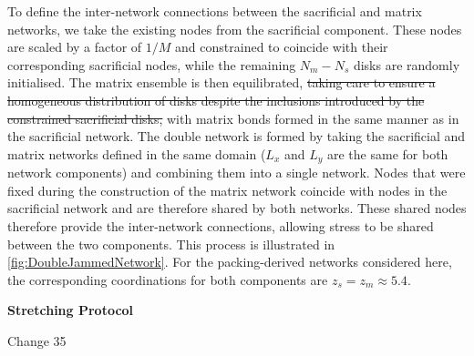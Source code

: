 \documentclass[asymmetricmargins]{library/duthesis}%
\newcommand{\DiffReportBodyFont}{\small}
\newcommand{\DiffReportLocationFont}{\large\bfseries}
\newcommand{\DiffReportMetaFont}{\small\ttfamily}
\newcommand{\DiffReportLocation}[1]{%
  \Needspace{4\baselineskip}%
  \par\medskip
  {\DiffReportLocationFont #1\par}
}
\newcommand{\DiffReportChange}[1]{%
  \Needspace{4\baselineskip}%
  \par\smallskip
  {\DiffReportMetaFont Change #1\par}
  \smallskip
}
\newenvironment{DiffReportContent}
  {\begingroup\DiffReportBodyFont}
  {\par\endgroup\medskip}
\providecommand{\DIFdel}[1]{{\protect\color{red}\sout{#1}}}                      %
\providecommand{\DIFdelbegin}{} %
\providecommand{\DIFdelend}{} %
\begin{document}
\begin{DiffReportContent}
To define the inter-network connections between the sacrificial and matrix networks, we take the existing nodes from the sacrificial component. These nodes are scaled by a factor of $1/M$ and constrained to coincide with their corresponding sacrificial nodes, while the remaining $N_m - N_s$ disks are randomly initialised. The matrix ensemble is then equilibrated, \DIFdelbegin \DIFdel{taking care to ensure a homogeneous distribution of disks despite the inclusions introduced by the constrained sacrificial disks, }\DIFdelend with matrix bonds formed in the same manner as in the sacrificial network. The double network is formed by taking the sacrificial and matrix networks defined in the same domain ($L_x$ and $L_y$ are the same for both network components) and combining them into a single network. Nodes that were fixed during the construction of the matrix network coincide with nodes in the sacrificial network and are therefore shared by both networks. These shared nodes therefore provide the inter-network connections, allowing stress to be shared between the two components. This process is illustrated in \cref{fig:DoubleJammedNetwork}. For the packing-derived networks considered here, the corresponding coordinations for both components are $z_s = z_m \approx 5.4$.
\end{DiffReportContent}
\DiffReportLocation{Stretching Protocol}
\DiffReportChange{35}
\end{document}
